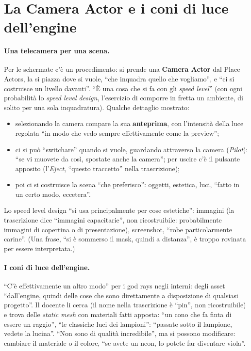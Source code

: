 \section{La Camera Actor e i coni di luce dell'engine}
\label{ue15:sec:camera}

\paragraph{Una telecamera per una scena.} Per le schermate c'è un procedimento: si prende una
\textbf{Camera Actor} dal Place Actors, la si piazza dove si vuole, ``che inquadra quello
che vogliamo'', e ``ci si costruisce un livello davanti''. ``È una cosa che si fa con gli
\emph{speed level}'' (con ogni probabilità lo \emph{speed level design}, l'esercizio di
comporre in fretta un ambiente, di solito per una sola inquadratura). Qualche dettaglio
mostrato:
\begin{itemize}
  \item selezionando la camera compare la sua \textbf{anteprima}, con l'intensità della luce
        regolata ``in modo che vedo sempre effettivamente come la preview'';
  \item ci si può ``switchare'' quando si vuole, guardando attraverso la camera
        (\emph{Pilot}): ``se vi muovete da così, spostate anche la camera''; per uscire c'è il
        pulsante apposito (l'\emph{Eject}, ``questo traccetto'' nella trascrizione);
  \item poi ci si costruisce la scena ``che preferisco'': oggetti, estetica, luci, ``fatto in
        un certo modo, eccetera''.
\end{itemize}
Lo speed level design ``si usa principalmente per cose estetiche'': immagini (la trascrizione
dice ``immagini capacitarie'', non ricostruibile: probabilmente immagini di copertina o di
presentazione), screenshot, ``robe particolarmente carine''. (Una frase, ``si è sommerso il
mask, quindi a distanza'', è troppo rovinata per essere interpretata.)

\paragraph{I coni di luce dell'engine.} ``C'è effettivamente un altro modo'' per i god rays
negli interni: degli asset ``dall'engine, quindi delle cose che sono direttamente a
disposizione di qualsiasi progetto''. Il docente li cerca (il nome nella trascrizione è
``pin'', non ricostruibile) e trova delle \emph{static mesh} con materiali fatti apposta: ``un
cono che fa finta di essere un raggio'', ``le classiche luci dei lampioni'': ``passate sotto il
lampione, vedete la lucina''. ``Non sono di qualità incredibile'', ma si possono modificare:
cambiare il materiale o il colore, ``se avete un neon, lo potete far diventare viola''.

